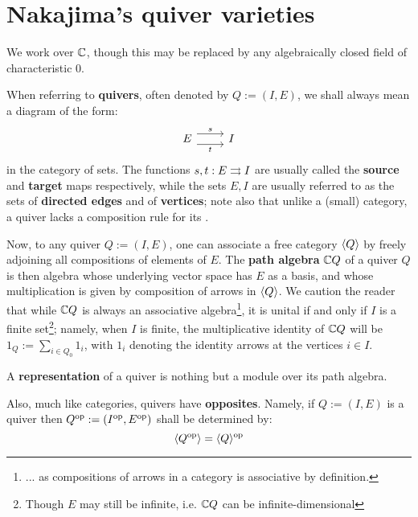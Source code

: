     \section{Nakajima's quiver varieties}
        \begin{convention}
            We work over $\mathbb{C}$, though this may be replaced by any algebraically closed field of characteristic $0$.
        \end{convention}
        \begin{convention}[Quivers]
            When referring to \textbf{quivers}, often denoted by $Q := (I, E)$, we shall always mean a diagram of the form:
                $$
                    \begin{tikzcd}
                	{E} & {I}
                	\arrow["t"', shift right=2, from=1-1, to=1-2]
                	\arrow["s", shift left=2, from=1-1, to=1-2]
                    \end{tikzcd}
                $$
            in the category of sets. The functions $s, t: E \rightrightarrows I$ are usually called the \textbf{source} and \textbf{target} maps respectively, while the sets $E, I$ are usually referred to as the sets of \textbf{directed edges} and of \textbf{vertices}; note also that unlike a (small) category, a quiver lacks a composition rule for its .

            Now, to any quiver $Q := (I, E)$, one can associate a free category $\langle Q\rangle$ by freely adjoining all compositions of elements of $E$. The \textbf{path algebra} $\mathbb{C} Q$ of a quiver $Q$ is then algebra whose underlying vector space has $E$ as a basis, and whose multiplication is given by composition of arrows in $\langle Q\rangle$. We caution the reader that while $\mathbb{C} Q$ is always an associative algebra\footnote{... as compositions of arrows in a category is associative by definition.}, it is unital if and only if $I$ is a finite set\footnote{Though $E$ may still be infinite, i.e. $\mathbb{C} Q$ can be infinite-dimensional}; namely, when $I$ is finite, the multiplicative identity of $\mathbb{C} Q$ will be $1_Q := \sum_{i \in Q_0} 1_i$, with $1_i$ denoting the identity arrows at the vertices $i \in I$.

            A \textbf{representation} of a quiver is nothing but a module over its path algebra. 

            Also, much like categories, quivers have \textbf{opposites}. Namely, if $Q := (I, E)$ is a quiver then $Q^{\mathrm{op}} := (I^{\mathrm{op}}, E^{\mathrm{op}})$ shall be determined by:
                $$\langle Q^{\mathrm{op}}\rangle = \langle Q\rangle^{\mathrm{op}}$$
        \end{convention}
